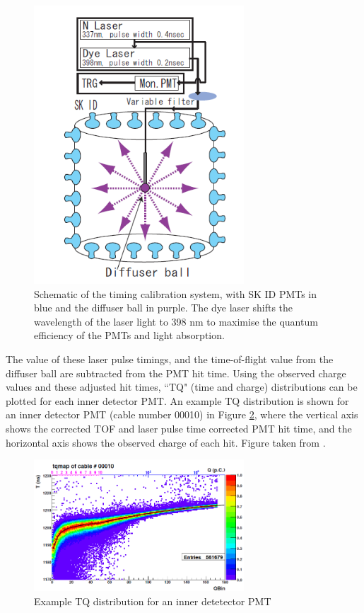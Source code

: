 \begin{figure}
\centering
    \includegraphics[width=0.7\textwidth]{Figures/timecalibsystem.png}
\caption{Schematic of the timing calibration system, with SK ID PMTs in blue and the diffuser ball in purple. The dye laser shifts the wavelength of the laser light to 398 nm to maximise the quantum efficiency of the PMTs and light absorption.}
    \label{fig:timecalibsystem}
\end{figure}


The value of these laser pulse timings, and the time-of-flight value from the diffuser ball are subtracted from the PMT hit time. Using the observed charge values and these adjusted hit times, ``TQ" (time and charge) distributions can be plotted for each inner detector PMT. An example TQ distribution is shown for an inner detector PMT (cable number 00010) in Figure \ref{fig:TQdist}, where the vertical axis shows the corrected TOF and laser pulse time corrected PMT hit time, and the horizontal axis shows the observed charge of each hit. Figure taken from \cite{abe_calibration_2014}. 

\begin{figure}
    \centering 
    \includegraphics[width=0.7\textwidth]{Figures/TQdist.png}
\caption{Example TQ distribution for an inner detetector PMT}
    \label{fig:TQdist}
\end{figure}


